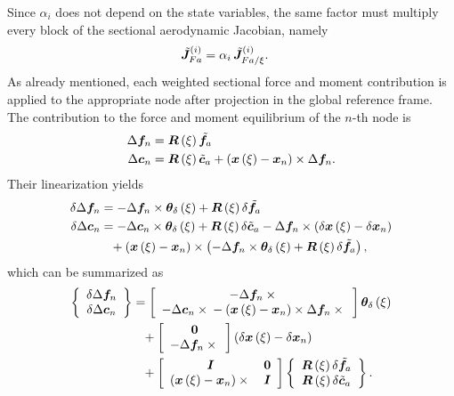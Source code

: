 Since $\alpha_i$ does not depend on the state variables, the same factor
must multiply every block of the sectional aerodynamic Jacobian, namely
\begin{align}
	\tilde{\TT{J}}_{Fa}^{(i)}
	&=
	\alpha_i\,\tilde{\TT{J}}_{Fa/\xi}^{(i)}
	.
\end{align}
As already mentioned, each weighted sectional force and moment contribution
is applied to the appropriate node after projection in the global reference
frame.
The contribution to the force and moment equilibrium of the $n$-th node is
\begin{subequations}
	\label{eq:aero:fm-contrib}
\begin{align}
	\Delta\T{f}_n
	&=
	\TT{R}\plbr{\xi} \tilde{\T{f}}_a
	\label{eq:aero:fm-contrib:f}
	\\
	\Delta\T{c}_n
	&=
	\TT{R}\plbr{\xi} \tilde{\T{c}}_a
	+ \plbr{\T{x}\plbr{\xi} - \T{x}_n} \times \Delta\T{f}_n
	\label{eq:aero:fm-contrib:m}
	.
\end{align}
\end{subequations}
Their linearization yields
\begin{subequations}
\begin{align}
	\delta\Delta\T{f}_n
	&=
	- \Delta\T{f}_n \times \T{\theta}_{\delta}\plbr{\xi}
	+ \TT{R}\plbr{\xi} \delta\tilde{\T{f}}_a
	\\
	\delta\Delta\T{c}_n
	&=
	- \Delta\T{c}_n \times \T{\theta}_{\delta}\plbr{\xi}
	+ \TT{R}\plbr{\xi} \delta\tilde{\T{c}}_a
	- \Delta\T{f}_n \times \plbr{
		\delta\T{x}\plbr{\xi}
		- \delta\T{x}_n
	}
	\nonumber \\
	&\hphantom{= } \mbox{}
	+ \plbr{
		\T{x}\plbr{\xi}
		- \T{x}_n
	} \times \plbr{
		- \Delta\T{f}_n \times \T{\theta}_{\delta}\plbr{\xi}
		+ \TT{R}\plbr{\xi} \delta\tilde{\T{f}}_a
	}
	,
\end{align}
\end{subequations}
which can be summarized as
\begin{align}
	\cubr{\cvvect{
		\delta\Delta\T{f}_n \\
		\delta\Delta\T{c}_n
	}}
	&=
	\sqbr{\cvvect{
		- \Delta\T{f}_n \times{} \\
		- \Delta\T{c}_n \times{}
		- \plbr{\T{x}\plbr{\xi} - \T{x}_n} \times \Delta\T{f}_n \times{}
	}} \T{\theta}_{\delta}\plbr{\xi}
	\nonumber \\
	& \hphantom{= } \mbox{}
	+ \sqbr{\cvvect{
		\TT{0} \\
		- \Delta\T{f}_n \times{}
	}} \plbr{
		\delta\T{x}\plbr{\xi}
		- \delta\T{x}_n
	}
	\nonumber \\
	& \hphantom{= } \mbox{}
	+ \sqbr{\matr{cc}{
		\TT{I} & \TT{0} \\
		\plbr{\T{x}\plbr{\xi} - \T{x}_n} \times{} & \TT{I}
	}} \cubr{\cvvect{
		\TT{R}\plbr{\xi} \delta\tilde{\T{f}}_a \\
		\TT{R}\plbr{\xi} \delta\tilde{\T{c}}_a
	}}
	.
\end{align}

